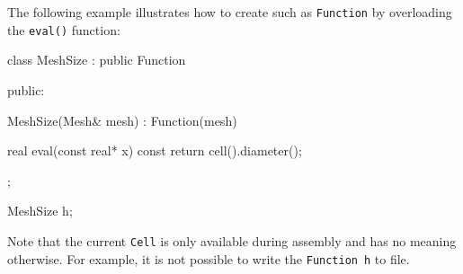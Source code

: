 The following example illustrates how to create such as
\texttt{Function} by overloading the \texttt{eval()} function:
\begin{code}
class MeshSize : public Function
{
public:

  MeshSize(Mesh& mesh) : Function(mesh) {}

  real eval(const real* x) const
  {
    return cell().diameter();
  }
    
};

MeshSize h;
\end{code}

Note that the current \texttt{Cell} is only available during assembly
and has no meaning otherwise. For example, it is not possible to write the
\texttt{Function}~\texttt{h} to file.


